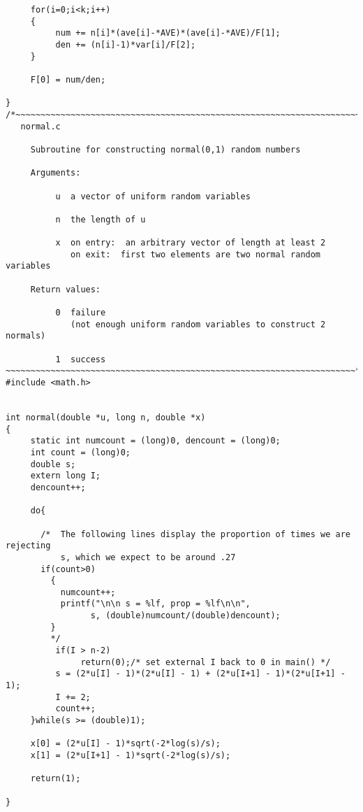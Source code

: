 \documentclass{article}
\begin{document}
\begin{verbatim}
     for(i=0;i<k;i++)
     {
          num += n[i]*(ave[i]-*AVE)*(ave[i]-*AVE)/F[1];
          den += (n[i]-1)*var[i]/F[2];
     }
     
     F[0] = num/den;
               
}
/*~~~~~~~~~~~~~~~~~~~~~~~~~~~~~~~~~~~~~~~~~~~~~~~~~~~~~~~~~~~~~~~~~~~~~~
   normal.c

     Subroutine for constructing normal(0,1) random numbers 

     Arguments:
     
          u  a vector of uniform random variables

          n  the length of u

          x  on entry:  an arbitrary vector of length at least 2
             on exit:  first two elements are two normal random variables

     Return values:
     
          0  failure
             (not enough uniform random variables to construct 2 normals)

          1  success
~~~~~~~~~~~~~~~~~~~~~~~~~~~~~~~~~~~~~~~~~~~~~~~~~~~~~~~~~~~~~~~~~~~~~~*/
#include <math.h>


int normal(double *u, long n, double *x)
{
     static int numcount = (long)0, dencount = (long)0;
     int count = (long)0;
     double s;
     extern long I;
     dencount++;
     
     do{

       /*  The following lines display the proportion of times we are rejecting
           s, which we expect to be around .27
       if(count>0)
         {
           numcount++; 
           printf("\n\n s = %lf, prop = %lf\n\n",
                 s, (double)numcount/(double)dencount);
         }
         */
          if(I > n-2) 
               return(0);/* set external I back to 0 in main() */
          s = (2*u[I] - 1)*(2*u[I] - 1) + (2*u[I+1] - 1)*(2*u[I+1] - 1);
          I += 2;
          count++;
     }while(s >= (double)1);

     x[0] = (2*u[I] - 1)*sqrt(-2*log(s)/s); 
     x[1] = (2*u[I+1] - 1)*sqrt(-2*log(s)/s);

     return(1);

}
\end{verbatim}
\end{document}
